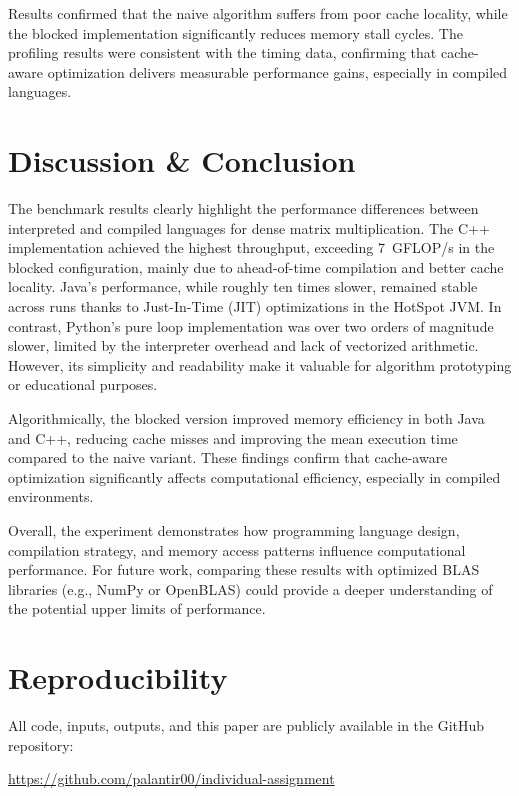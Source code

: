 \documentclass[11pt]{article}
\begin{document}
Results confirmed that the naive algorithm suffers from poor cache locality, while the blocked implementation significantly reduces memory stall cycles. The profiling results were consistent with the timing data, confirming that cache-aware optimization delivers measurable performance gains, especially in compiled languages.

\section{Discussion \& Conclusion}
The benchmark results clearly highlight the performance differences between interpreted and compiled languages for dense matrix multiplication. 
The C++ implementation achieved the highest throughput, exceeding 7~GFLOP/s in the blocked configuration, mainly due to ahead-of-time compilation and better cache locality. 
Java's performance, while roughly ten times slower, remained stable across runs thanks to Just-In-Time (JIT) optimizations in the HotSpot JVM. 
In contrast, Python’s pure loop implementation was over two orders of magnitude slower, limited by the interpreter overhead and lack of vectorized arithmetic. 
However, its simplicity and readability make it valuable for algorithm prototyping or educational purposes.

Algorithmically, the blocked version improved memory efficiency in both Java and C++, reducing cache misses and improving the mean execution time compared to the naive variant. 
These findings confirm that cache-aware optimization significantly affects computational efficiency, especially in compiled environments.

Overall, the experiment demonstrates how programming language design, compilation strategy, and memory access patterns influence computational performance. 
For future work, comparing these results with optimized BLAS libraries (e.g., NumPy or OpenBLAS) could provide a deeper understanding of the potential upper limits of performance.

\section*{Reproducibility}
All code, inputs, outputs, and this paper are publicly available in the GitHub repository: 

\href{https://github.com/palantir00/individual-assignment}{https://github.com/palantir00/individual-assignment}
\end{document}
